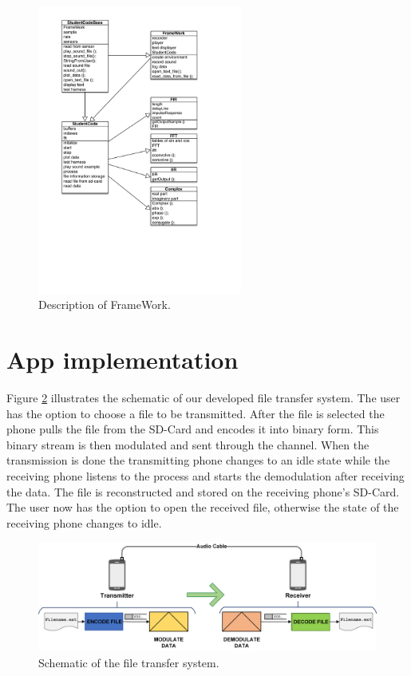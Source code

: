 \documentclass[12pt,a4paper,openright]{report}
\begin{document}
 \begin{figure}[H]
  \centering
    \includegraphics[width=0.6\textwidth]{UmlScheme.pdf}
    \caption[Description of FrameWork]{Description of FrameWork. }
    \label{fig:FrameWorkPicture}
\end{figure}



\section{App implementation} %

Figure \ref{fig:SchematicsSystem} illustrates the schematic of our developed file transfer system. The user has the option to choose a file to be transmitted. After the file is selected the phone pulls the file from the SD-Card and encodes it into binary form. This binary stream is then modulated and sent through the channel. When the transmission is done the transmitting phone changes to an idle state while the receiving phone listens to the process and starts the demodulation after receiving the data. The file is reconstructed and stored on the receiving phone's SD-Card. The user now has the option to open the received file, otherwise the state of the receiving phone changes to idle.

 \begin{figure}[H]
  \centering
    \includegraphics[width=1\textwidth]{FullSystem.png}
    \caption[Schematic of the file transfer system]{Schematic of the file transfer system.}
    \label{fig:SchematicsSystem}
\end{figure}
\end{document}
